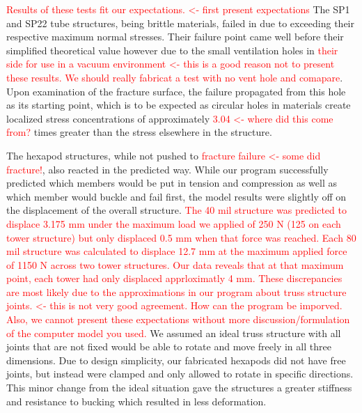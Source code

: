 \documentclass[final]{svjour2}
\begin{document}
\textcolor{red}{Results of these tests fit our expectations. <- first present expectations}    The SP1 and SP22 tube structures, being brittle materials, failed in due to exceeding their respective maximum normal stresses.  Their failure point came well before their simplified theoretical value however due to the small ventilation holes in \textcolor{red}{their side for use in a vacuum environment <- this is a good reason not to present these results. We should really fabricat a test with no vent hole and comapare}.  Upon examination of the fracture surface, the failure propagated from this hole as its starting point, which is to be expected as circular holes in materials create localized stress concentrations of approximately \textcolor{red}{3.04 <- where did this come from?} times greater than the stress elsewhere in the structure.  

The hexapod structures, while not pushed to \textcolor{red}{fracture failure <- some did fracture!}, also reacted in the predicted way.  While our program successfully predicted which members would be put in tension and compression as well as which member would buckle and fail first, the model results were slightly off on the displacement of the overall structure.  \textcolor{red}{The 40 mil structure was predicted to displace 3.175 mm under the maximum load we applied of 250 N (125 on each tower structure) but only displaced 0.5 mm when that force was reached. Each 80 mil structure was calculated to displace 12.7 mm at the maximum applied force of 1150 N across two tower structures.  Our data reveals that at that maximum point, each tower had only displaced apprloximatly 4 mm.  These discrepancies are most likely due to the approximations in our program about truss structure joints. <- this is not very good agreement. How can the program be imporved. Also, we cannot present these expectations without more discussion/formulation of the computer model you used.}  We assumed an ideal truss structure with all joints that are not fixed would be able to rotate and move freely in all three dimensions.  Due to design simplicity, our fabricated hexapods did not have free joints, but instead were clamped and only allowed to rotate in specific directions.  This minor change from the ideal situation gave the structures a greater stiffness and resistance to bucking which resulted in less deformation.
\end{document}
